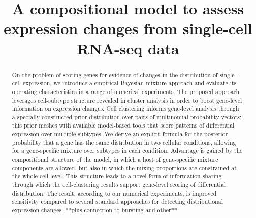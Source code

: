 \documentclass[aoas,preprint]{imsart}
\begin{document}
\begin{frontmatter}
\title{A compositional model to assess expression changes from
 single-cell RNA-seq data}



\begin{abstract}
On the problem of scoring genes for evidence of changes in the distribution of single-cell expression, we
introduce a empirical Bayesian mixture approach and evaluate its operating characteristics 
in a range of numerical experiments.  The proposed approach leverages cell-subtype 
structure revealed in cluster analysis in order to boost gene-level information on expression changes.
Cell clustering informs gene-level analysis through a specially-constructed prior distribution
over pairs of multinomial probability vectors; this prior meshes with available model-based tools
that score patterns of differential expression over multiple subtypes.   
We derive an explicit formula for the posterior probability that a gene has the same distribution
in two cellular conditions, allowing for a gene-specific mixture over subtypes in each condition.
Advantage is gained by the compositional structure of the model, in which a host of gene-specific
mixture components are allowed, but also in which the mixing proportions are constrained at the whole 
cell level.  This structure leads to a novel form of information sharing through which the cell-clustering
results support gene-level scoring of differential distribution.  The result, according to our
numerical experiments, is improved sensitivity compared to several standard approaches
 for detecting distributional expression changes.  **plus connection to bursting and other**
\end{abstract}


\end{frontmatter}
\end{document}
